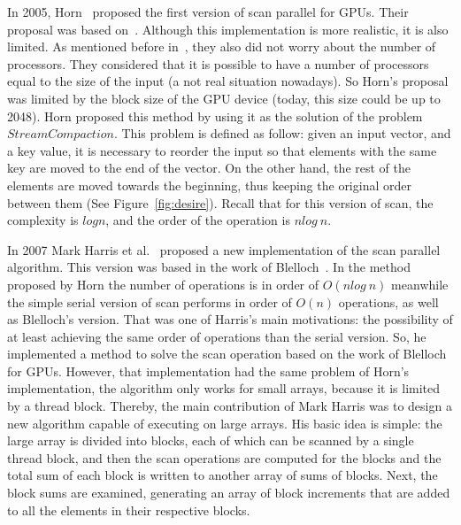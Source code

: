 \documentclass[Ingles]{ic-tese-v1}
\begin{document}
In 2005, Horn~\cite{GPUGems2} proposed the first version of scan parallel
for GPUs. Their proposal was based on~\cite{dataparallel}. Although this
implementation is more realistic, it is also  limited. As  mentioned before in~\cite{dataparallel},
they also did not worry about the number of processors.
They considered that it is possible to have a number of processors equal to the
size of the input (a not real situation nowadays).
So Horn's proposal was limited by the block size of the GPU device (today, this size could
be up to 2048). Horn proposed this method by using it
as the solution of the problem $Stream Compaction$. This problem is defined
as follow: given an input vector, and a key value,  it is necessary to
reorder the input so that elements with the same key are moved to the end of
the vector. On the other hand, the rest of the elements are moved towards the beginning,
thus keeping the original order between them (See Figure~\ref{fig:desire}). Recall
that for this version of scan, the complexity is $log n$, and the order of
the operation is $n log\ n$.

In 2007 Mark Harris et al.~\cite{harris2007parallel} proposed a new
implementation of the scan parallel algorithm. This version was based in the work
of Blelloch~\cite{ScanAsPrimitive}. In the method proposed by Horn the number
of operations is in order of $O(n log\ n)$ meanwhile the simple serial version
of scan performs in order of $O(n)$ operations, as well as Blelloch's version.
That was one of Harris's main motivations: the possibility of at least achieving
the same order of operations than the serial version. So, he implemented a
method to solve the scan operation based on the work of Blelloch for GPUs.
However, that implementation had the same problem of Horn's implementation, the
algorithm only works for small arrays, because it is limited by a thread
block. Thereby, the main contribution of Mark Harris was to design a new
algorithm capable of executing on large arrays. His basic idea is simple:
the large array is divided into blocks, each of which
can be scanned by a single thread block, and then the scan operations are
computed for the blocks and the total sum of each block is written to another
array of sums of blocks. Next, the block sums are examined, generating an array
of block increments that are added to all the elements in their respective
blocks.
\end{document}
